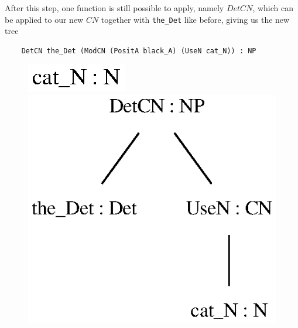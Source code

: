After this step, one function is still possible to apply, namely $DetCN$, which can be applied to our new $CN$ together with \lstinline{the_Det} like before, giving us the new tree
\begin{lstlisting}
    DetCN the_Det (ModCN (PositA black_A) (UseN cat_N)) : NP
\end{lstlisting}

\begin{figure}
    \centering
        {\includegraphics[scale=0.6]{figure/black_cats/cat_N_gf.eps}}\\
        {\includegraphics[scale=0.6]{figure/black_cats/the_cat_NP_gf.eps}}

\end{figure}
